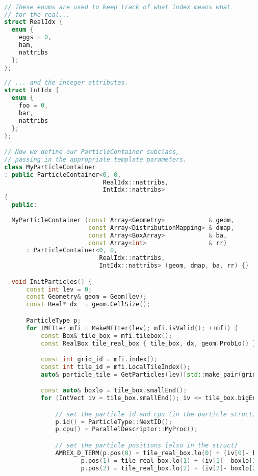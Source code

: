 \begin{lstlisting}[language=cpp]

  // These enums are used to keep track of what index means what
  // for the real... 
  struct RealIdx {
    enum {
      eggs = 0,
      ham,
      nattribs
    };
  };
  
  // ... and the integer attributes.
  struct IntIdx {
    enum {
      foo = 0,
      bar,
      nattribs
    };
  };

  // Now we define our ParticleContainer subclass, 
  // passing in the appropriate template parameters.
  class MyParticleContainer
  : public ParticleContainer<0, 0,
                             RealIdx::nattribs,
                             IntIdx::nattribs>
  {
    public:
    
    MyParticleContainer (const Array<Geometry>            & geom,
                         const Array<DistributionMapping> & dmap,
                         const Array<BoxArray>            & ba,
                         const Array<int>                 & rr)
        : ParticleContainer<0, 0,
                            RealIdx::nattribs,
                            IntIdx::nattribs> (geom, dmap, ba, rr) {}

    void InitParticles() {
        const int lev = 0;
        const Geometry& geom = Geom(lev);
        const Real* dx  = geom.CellSize();

        ParticleType p;
        for (MFIter mfi = MakeMFIter(lev); mfi.isValid(); ++mfi) {
            const Box& tile_box = mfi.tilebox();
            const RealBox tile_real_box { tile_box, dx, geom.ProbLo() };

            const int grid_id = mfi.index();
            const int tile_id = mfi.LocalTileIndex();
            auto& particle_tile = GetParticles(lev)[std::make_pair(grid_id, tile_id)];

            const auto& boxlo = tile_box.smallEnd();
            for (IntVect iv = tile_box.smallEnd(); iv <= tile_box.bigEnd(); tile_box.next(iv)) {

                // set the particle id and cpu (in the particle struct)
                p.id() = ParticleType::NextID();
                p.cpu() = ParallelDescriptor::MyProc();

                // set the particle positions (also in the struct)
                AMREX_D_TERM(p.pos(0) = tile_real_box.lo(0) + (iv[0]- boxlo[0] + 0.5)*dx[0];,
                       p.pos(1) = tile_real_box.lo(1) + (iv[1]- boxlo[1] + 0.5)*dx[1];,
                       p.pos(2) = tile_real_box.lo(2) + (iv[2]- boxlo[2] + 0.5)*dx[2];);


\end{lstlisting}

